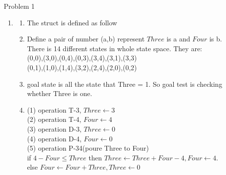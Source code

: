 \normalfont\documentclass[letterpaper,11pt]{article}
\begin{document}
\setlength{\parindent}{2ex}
\newcommand{\header}{
	\noindent {}
}
\bigskip
\header

\SetAlgoLined
{}
\begin{enumerate}
\item[Problem 1]\par
	\begin{enumerate}
	\item
		\begin{enumerate}
		\item The struct is defined as follow\par
			\begin{algorithm}[H]
			\end{algorithm}
		\item Define a pair of number (a,b) represent $Three$ is a and $Four$ is b.
			There is 14 different states in whole state space. They are:\\ 
			(0,0),(3,0),(0,4),(0,3),(3,4),(3,1),(3,3)\\
			(0,1),(1,0),(1,4),(3,2),(2,4),(2,0),(0,2)\\
		\item
			goal state is all the state that Three = 1.	So goal test is checking whether Three is one.
		\item
			(1) operation T-3, $Three \gets 3$ \\
			(2) operation T-4, $Four \gets 4$ \\
			(3) operation D-3, $Three \gets 0$ \\
			(4) operation D-4, $Four \gets 0$ \\
			(5) operation P-34(poure Three to Four)\\
			if $4 - Four \le Three$ then $Three \gets Three + Four - 4, Four \gets 4$. \\else $Four \gets Four + Three, Three \gets 0$\\

\end{enumerate}
\end{enumerate}
\end{enumerate}
\end{document}
